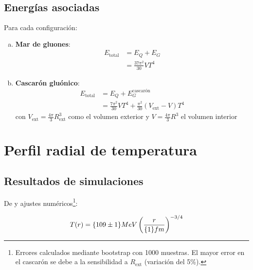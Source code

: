 \subsection{Energías asociadas}
Para cada configuración:


\begin{enumerate}[(a)]
    \item \textbf{Mar de gluones}:
    \begin{equation}
        \begin{aligned}
        E_{\text{total}} &= E_Q + E_G \\
        &= \frac{37\pi^2}{30}VT^4
        \end{aligned}
    \end{equation}
    
    \item \textbf{Cascarón gluónico}:
    \begin{equation}
        \begin{aligned}
        E_{\text{total}} &= E_Q + E_G^{\text{cascarón}} \\
        &= \frac{7\pi^2}{30}VT^4 + \frac{\pi^2}{30}(V_{\text{ext}} - V)T^4
        \end{aligned}
    \end{equation}
    con $V_{\text{ext}} = \frac{4\pi}{3}R^3_{\text{ext}}$ como el volumen exterior y $V = \frac{4\pi}{3}R^3$ el volumen interior
\end{enumerate}

\section{Perfil radial de temperatura}\label{sec:T(r)}
\subsection{Resultados de simulaciones}
De \cite{tan2019} y ajustes numéricos\footnote{Errores calculados mediante bootstrap con 1000 muestras. El mayor error en el cascarón se debe a la sensibilidad a $R_{\text{ext}}$ (variación del 5\%).}:

\begin{equation}\label{eq-Tclassic}
    T(r) = \qty{109 \pm 1}{MeV}\left(\frac{r}{\qty{1}{fm}}\right)^{-3/4}
\end{equation}

